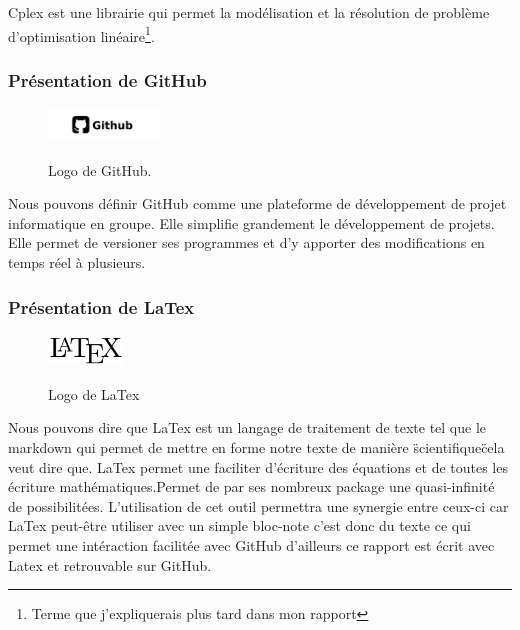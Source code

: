 Cplex est une librairie qui permet la modélisation et la résolution de problème d'optimisation linéaire\footnote{Terme que j'expliquerais plus tard dans mon rapport}.
\newline
\newline
\subsubsection{Présentation de GitHub}
\begin{figure}[h]
  \begin{center}
  \includegraphics[width=3cm]{./images/github.jpg}\label{GitHub}
  \caption{Logo de GitHub.}
  \end{center}
\end{figure}


Nous pouvons définir GitHub comme une plateforme de développement de projet informatique en groupe. Elle simplifie grandement le développement de projets. Elle permet de versioner ses programmes et d'y apporter des modifications en temps réel à plusieurs.

\subsubsection{Présentation de LaTex}

\begin{figure}[h]
  \begin{center}
\includegraphics[width=2cm]{./images/Latex.png}\label{LaTex}
\caption{Logo de LaTex}
\end{center}
\end{figure}

Nous pouvons dire que LaTex est un langage de traitement de texte tel que le markdown qui permet de mettre en forme notre texte de manière \"scientifique\" cela veut dire que. LaTex permet une faciliter d'écriture des équations et de toutes les écriture mathématiques.Permet de par ses nombreux package une quasi-infinité de possibilitées.
L'utilisation de cet outil permettra une synergie entre ceux-ci car LaTex peut-être utiliser avec un simple bloc-note c'est donc du texte ce qui permet une intéraction facilitée avec GitHub d'ailleurs ce rapport est écrit avec Latex et retrouvable sur GitHub.\newline


